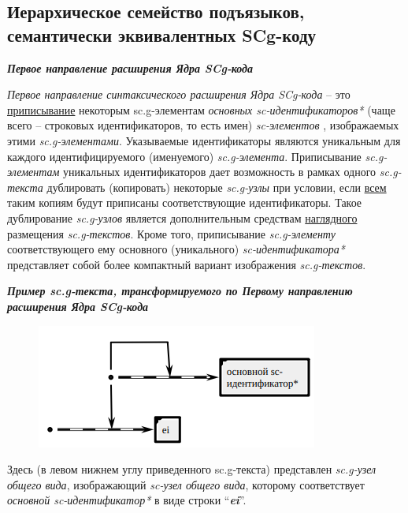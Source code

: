 \subsection{Иерархическое семейство подъязыков, семантически эквивалентных SCg-коду}

\textbf{\textit{Первое направление расширения Ядра SCg-кода}}

\textit{Первое направление синтаксического расширения Ядра SCg-кода} -- это \uline{приписывание} некоторым \mbox{sc.g-элементам} \textit{основных sc-идентификаторов*} (чаще всего -- строковых идентификаторов, то есть имен) \textit{sc-элементов} , изображаемых этими \textit{sc.g-элементами}. Указываемые идентификаторы являются уникальным для каждого идентифицируемого (именуемого) \textit{sc.g-элемента}. Приписывание \textit{sc.g-элементам} уникальных идентификаторов дает возможность в рамках одного \textit{sc.g-текста} дублировать (копировать) некоторые \textit{sc.g-узлы} при условии, если \uline{всем} таким копиям будут приписаны соответствующие идентификаторы. Такое дублирование \textit{sc.g-узлов} является дополнительным средствам \uline{наглядного} размещения \textit{sc.g-текстов}. Кроме того, приписывание \textit{sc.g-элементу} соответствующего ему основного (уникального) \textit{sc-идентификатора*} представляет собой более компактный вариант изображения \textit{sc.g-текстов}.

\textbf{\textit{Пример sc.g-текста, трансформируемого по Первому направлению расширения Ядра SCg-кода}}

\begin{figure}[h]
	\centering
	\includegraphics[scale=0.8]{images/intro/scg/scg_transf1.png}
\end{figure}

Здесь (в левом нижнем углу приведенного sc.g-текста) представлен \textit{sc.g-узел общего вида}, изображающий \textit{sc-узел общего вида}, которому соответствует \textit{основной sc-идентификатор*} в виде строки ``\textbf{\textit{ei}}''.


